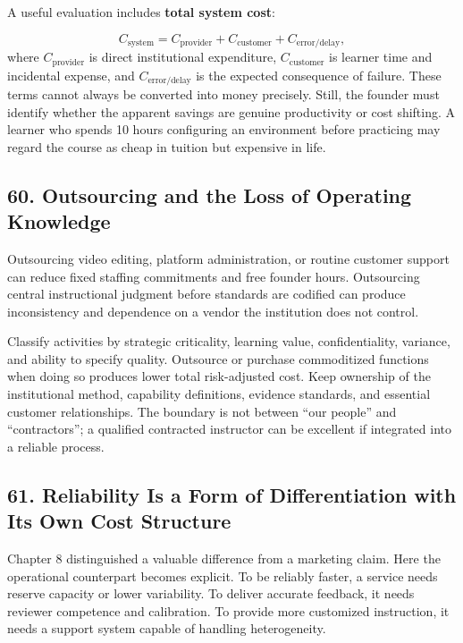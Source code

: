 A useful evaluation includes \textbf{total system cost}:

\begin{equation}
C_{\text{system}} = C_{\text{provider}} + C_{\text{customer}} + C_{\text{error/delay}},
\end{equation}
where $C_{\text{provider}}$ is direct institutional expenditure, $C_{\text{customer}}$ is learner time and incidental expense, and $C_{\text{error/delay}}$ is the expected consequence of failure. These terms cannot always be converted into money precisely. Still, the founder must identify whether the apparent savings are genuine productivity or cost shifting. A learner who spends 10 hours configuring an environment before practicing may regard the course as cheap in tuition but expensive in life.

\subsection*{60. Outsourcing and the Loss of Operating Knowledge}

Outsourcing video editing, platform administration, or routine customer support can reduce fixed staffing commitments and free founder hours. Outsourcing central instructional judgment before standards are codified can produce inconsistency and dependence on a vendor the institution does not control.

Classify activities by strategic criticality, learning value, confidentiality, variance, and ability to specify quality. Outsource or purchase commoditized functions when doing so produces lower total risk-adjusted cost. Keep ownership of the institutional method, capability definitions, evidence standards, and essential customer relationships. The boundary is not between ``our people'' and ``contractors''; a qualified contracted instructor can be excellent if integrated into a reliable process.

\subsection*{61. Reliability Is a Form of Differentiation with Its Own Cost Structure}

Chapter 8 distinguished a valuable difference from a marketing claim. Here the operational counterpart becomes explicit. To be reliably faster, a service needs reserve capacity or lower variability. To deliver accurate feedback, it needs reviewer competence and calibration. To provide more customized instruction, it needs a support system capable of handling heterogeneity.

